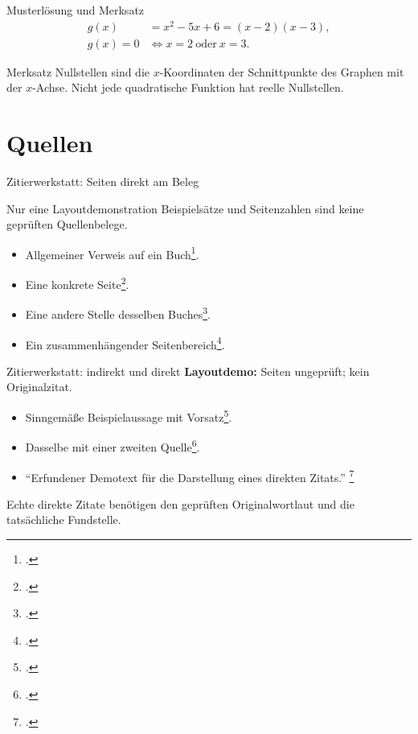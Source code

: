 \documentclass[aspectratio=169,11pt]{beamer}
\begin{document}
\begin{frame}{Musterlösung und Merksatz}
  \begin{align*}
    g(x)&=x^2-5x+6=(x-2)(x-3), \\
    g(x)=0 &\iff x=2\ \text{oder}\ x=3.
  \end{align*}
  \begin{block}{Merksatz}
    Nullstellen sind die \(x\)-Koordinaten der Schnittpunkte des Graphen
    mit der \(x\)-Achse. Nicht jede quadratische Funktion hat reelle Nullstellen.
  \end{block}
\end{frame}

\section{Quellen}
\begin{frame}{Zitierwerkstatt: Seiten direkt am Beleg}
  \begin{alertblock}{Nur eine Layoutdemonstration}
    Beispielsätze und Seitenzahlen sind keine geprüften Quellenbelege.
  \end{alertblock}
  \begin{itemize}
    \item Allgemeiner Verweis auf ein Buch\footcite{polya1945}.
    \item Eine konkrete Seite\footcite[S.~23]{polya1945}.
    \item Eine andere Stelle desselben Buches\footcite[S.~42]{polya1945}.
    \item Ein zusammenhängender Seitenbereich\footcite[S.~10--12]{spivak2008}.
  \end{itemize}
\end{frame}

\begin{frame}{Zitierwerkstatt: indirekt und direkt}
  \small\textbf{Layoutdemo:} Seiten ungeprüft; kein Originalzitat.
  \begin{itemize}
    \item Sinngemäße Beispielaussage mit Vorsatz\footcite[vgl.][S.~23--25]{polya1945}.
    \item Dasselbe mit einer zweiten Quelle\footcite[vgl.][S.~15]{spivak2008}.
    \item \enquote{Erfundener Demotext für die Darstellung eines direkten Zitats.}%
      \footcite[S.~23]{polya1945}
  \end{itemize}
  \medskip
  \small Echte direkte Zitate benötigen den geprüften Originalwortlaut
  und die tatsächliche Fundstelle.
\end{frame}
\end{document}
